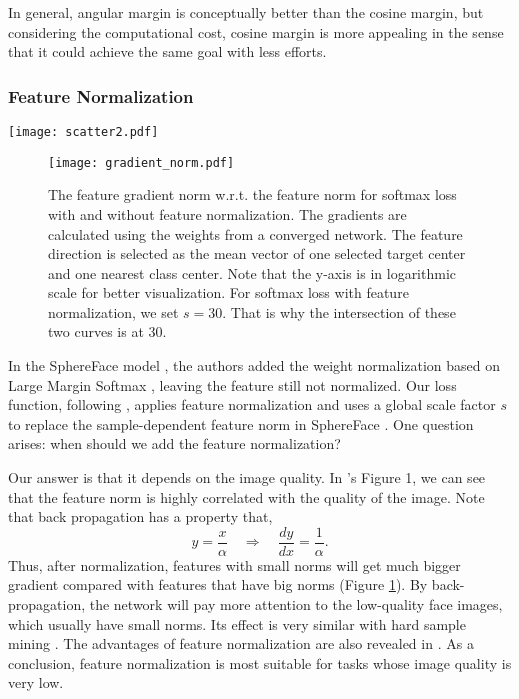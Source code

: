 \documentclass[10pt,twocolumn,letterpaper]{article}
\begin{document}
In general, angular margin is conceptually better than the cosine margin, but considering the computational cost, cosine margin is more appealing in the sense that it could achieve the same goal with less efforts.

\subsubsection{Feature Normalization}

\begin{figure*}
	\centering
	\texttt{[image: scatter2.pdf]}
	\caption{ Feature distribution visualization of several loss functions. Each point on the sphere represent one normalized feature. Different colors denote different classes. For SphereFace \cite{liu2017sphereface}, we have already tried to use the best hyper-parameters we could find.}
	\label{fig:scatter}
\end{figure*}
\begin{figure}
	\centering
	\texttt{[image: gradient\_norm.pdf]}
	\caption{ The feature gradient norm w.r.t. the feature norm for softmax loss with and without feature normalization. The gradients are calculated using the weights from a converged network. The feature direction is selected as the mean vector of one selected target center and one nearest class center.  Note that the y-axis is in logarithmic scale for better visualization. For softmax loss with feature normalization, we set $s=30$. That is why the intersection of these two curves is at $30$. }
	\label{fig:gradient_norm}
\end{figure}

In the SphereFace model \cite{liu2017sphereface}, the authors added the weight normalization based on Large Margin Softmax \cite{liu2016large}, leaving the feature still not normalized. Our loss function, following \cite{wang2017normface,liu_2017_coco_v2,ranjan2017l2}, applies feature normalization and uses a global scale factor $s$ to replace the sample-dependent feature norm in SphereFace \cite{liu2017sphereface}. One question arises: when should we add the feature normalization?

Our answer is that it depends on the image quality. In \cite{ranjan2017l2}'s Figure 1, we can see that the feature norm is highly correlated with the quality of the image.
Note that back propagation has a property that,
\begin{equation}
y = \frac{x}{\alpha} \quad \Rightarrow \quad \frac{dy}{dx} = \frac{1}{\alpha}.
\end{equation}
Thus, after normalization, features with small norms will get much bigger gradient compared with features that have big norms (Figure \ref{fig:gradient_norm}). By back-propagation, the network will pay more attention to the low-quality face images, which usually have small norms. Its effect is very similar with hard sample mining  \cite{schroff2015facenet,lin2017focal}. The advantages of feature normalization are also revealed in \cite{liu2017spherenet}. As a conclusion, feature normalization is most suitable for tasks whose image quality is very low.
\end{document}
